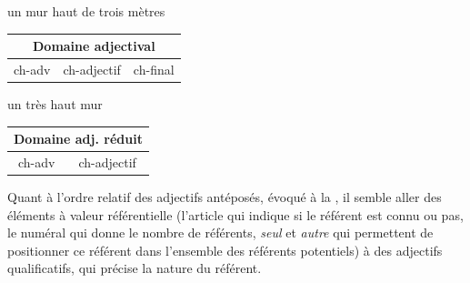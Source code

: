 {    \ea 
    \ea un mur haut de trois mètres\\
    \begin{center}
    \def\arraystretch{1.5}
    \setlength{\tabcolsep}{4ex}
    \begin{tabular}{|c|c|c|}
    \hline
    \multicolumn{3}{|c|}{Domaine adjectival}\\\hline
    ch-adv & \cellcolor{lsDOIGray} ch-adjectif & ch-final\\
    \hline
    \end{tabular}
    \end{center}
    
    \ex un très haut mur\\
    \begin{center}
    \def\arraystretch{1.5}
    \setlength{\tabcolsep}{4ex}
    \begin{tabular}{|c|c|}
    \hline
    \multicolumn{2}{|c|}{Domaine adj. réduit}\\\hline
    ch-adv & \cellcolor{lsDOIGray}ch-adjectif\\
    \hline
    \end{tabular}
    \end{center}
    \z
    \z

    Quant à l’ordre relatif des adjectifs antéposés, évoqué à la , il semble aller des éléments à valeur référentielle (l’article qui indique si le référent est connu ou pas, le numéral qui donne le nombre de référents, \textit{seul} et \textit{autre} qui permettent de positionner ce référent dans l’ensemble des référents potentiels) à des adjectifs qualificatifs, qui précise la nature du référent.
}

